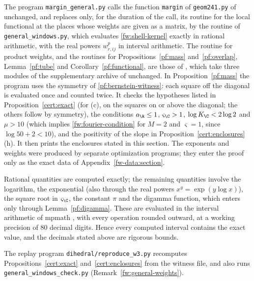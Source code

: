 The program \texttt{margin\_general.py} calls the function \texttt{margin} of
\texttt{geom241.py} of \cite{Naslund04273} unchanged, and replaces only, for
the duration of the call, its routine for the local functional at the places
whose weights are given as a matrix, by the routine of
\texttt{general\_windows.py}, which evaluates \eqref{fw:shell-kernel} exactly
in rational arithmetic, with the real powers $w_{r,ij}^p$ in interval
arithmetic. The routine for product weights, and the routines for
Propositions~\ref{pf:mass} and~\ref{pf:overlap}, Lemma~\ref{pf:tube} and
Corollary~\ref{pf:functional}, are those of \cite{Naslund04273}, which take
three modules of the supplementary archive of \cite{Naslund0418235} unchanged.
In Proposition~\ref{pf:mass} the program uses the symmetry of
\eqref{pf:bernstein-witness}: each square off the diagonal is evaluated once
and counted twice. It checks the hypotheses listed in
Proposition~\ref{cert:exact} (for (c), on the squares on or above the
diagonal; the others follow by symmetry), the conditions $a_\R\le1$,
$\varsigma_\C>1$, $\log K_\C<2\log2$ and $\mu>10$ (which implies
\eqref{fw:fourier-condition} for $M=2$ and $\varsigma=1$, since $\log50+2<10$),
and the positivity of the slope in Proposition~\ref{cert:enclosures}(h). It
then prints the enclosures stated in this section. The exponents and weights
were produced by separate optimization programs; they enter the proof only
as the exact data of Appendix~\ref{fw-data:section}.

Rational quantities are computed exactly; the remaining quantities involve the
logarithm, the exponential (also through the real powers $x^y=\exp(y\log x)$),
the square root in $\varsigma_\C$, the constant $\pi$ and the digamma function,
which enters only through Lemma~\ref{pf:digamma}. These are evaluated in the
interval arithmetic of mpmath \cite{Mpmath}, with every operation rounded
outward, at a working precision of $80$ decimal digits. Hence every computed
interval contains the exact value, and the decimals stated above are rigorous
bounds.

The replay program \texttt{dihedral/reproduce\_w3.py} recomputes
Propositions~\ref{cert:exact} and~\ref{cert:enclosures} from the witness file,
and also runs \texttt{general\_windows\_check.py}
(Remark~\ref{fw:general-weights}).
